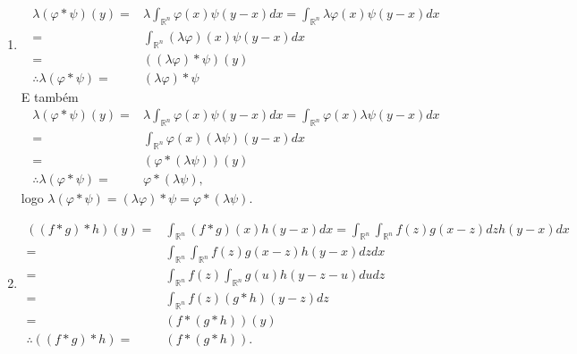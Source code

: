 \documentclass{article}
\begin{document}
\begin{enumerate}
\begin{enumerate}
\begin{enumerate}
						\item
						$$
						\begin{aligned}
						\lambda(\varphi*\psi)(y) = & \lambda \int_{\mathbb{R}^{n}}\varphi(x)\psi(y-x)dx = \int_{\mathbb{R}^{n}}\lambda\varphi(x)\psi(y-x)dx
						\\
						=& \int_{\mathbb{R}^{n}}(\lambda\varphi)(x)\psi(y-x)dx
						\\
						= & ((\lambda \varphi)*\psi)(y)
						\\
						\therefore \lambda( \varphi*\psi) = & (\lambda \varphi)*\psi
						\end{aligned}
						$$
						E também
						$$
						\begin{aligned}
						\lambda(\varphi*\psi)(y) = & \lambda \int_{\mathbb{R}^{n}}\varphi(x)\psi(y-x)dx = \int_{\mathbb{R}^{n}}\varphi(x)\lambda\psi(y-x)dx
						\\
						=& \int_{\mathbb{R}^{n}}\varphi(x)(\lambda\psi)(y-x)dx
						\\
						= & (\varphi*(\lambda\psi))(y)
						\\
						\therefore \lambda( \varphi*\psi) = & \varphi*(\lambda \psi),
						\end{aligned}
						$$
						logo $\lambda( \varphi*\psi)=(\lambda \varphi)*\psi=\varphi*(\lambda \psi)$.
						
						\item 
							$$
							\begin{aligned}
							((f*g)*h)(y) = & \int_{\mathbb{R}^{n}}(f*g)(x)h(y-x)dx =  \int_{\mathbb{R}^{n}}\int_{\mathbb{R}^{n}}f(z)g(x-z)dzh(y-x)dx
							\\
							= & \int_{\mathbb{R}^{n}}\int_{\mathbb{R}^{n}}f(z)g(x-z)h(y-x)dzdx
							\\
							= & \int_{\mathbb{R}^{n}}f(z)\int_{\mathbb{R}^{n}}g(u)h(y-z-u)dudz
							\\
							= & \int_{\mathbb{R}^{n}}f(z)(g*h)(y-z)dz
							\\
							= & 
							(f*(g*h))(y)
							\\
							\therefore ((f*g)*h) = & (f*(g*h)).
							\end{aligned}
							$$
							

\end{enumerate}
\end{enumerate}
\end{enumerate}
\end{document}
